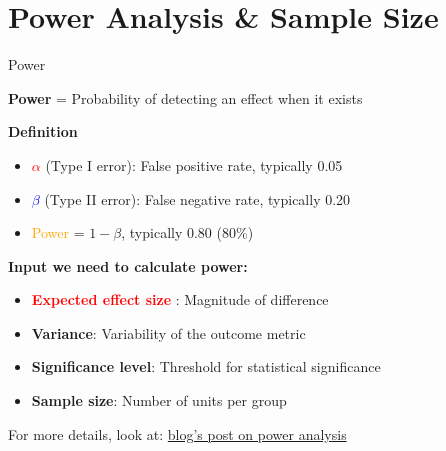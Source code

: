 \documentclass{beamer}
\newcommand{\blue}[1]{\textcolor{blue}{#1}}
\newcommand{\red}[1]{\textcolor{red}{#1}}
\newcommand{\orange}[1]{\textcolor{orange}{#1}}
\begin{document}

\section{Power Analysis \& Sample Size}

\begin{frame}{Power }

\textbf{Power} = Probability of detecting an effect when it exists

\vspace{0.3cm}
\textbf{Definition}
\begin{itemize}
    \item \red{$\alpha$} (Type I error): False positive rate, typically 0.05
    \item \blue{$\beta$} (Type II error): False negative rate, typically 0.20
    \item \orange{Power} = $1 - \beta$, typically 0.80 (80\%)
\end{itemize}

\textbf{Input we need to calculate power:}
\begin{itemize}
    \item \red{\textbf{Expected effect size}} : Magnitude of difference
    \item \textbf{Variance}: Variability of the outcome metric
    \item \textbf{Significance level}: Threshold for statistical significance
    \item \textbf{Sample size}: Number of units per group
\end{itemize}

For more details, look at: \blue{\href{https://sdaza.com/blog/2025/statistical-power/}{blog's post on power analysis}}
\end{frame}
\end{document}
